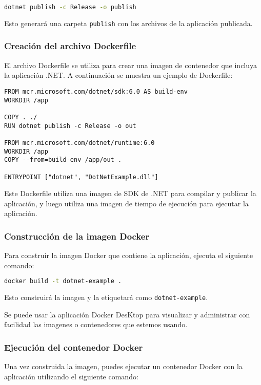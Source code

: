 \documentclass{article}
\begin{document}
\begin{lstlisting}[language=bash]
dotnet publish -c Release -o publish
\end{lstlisting}

Esto generará una carpeta \texttt{publish} con los archivos de la aplicación publicada.

\subsubsection*{Creación del archivo Dockerfile}
El archivo Dockerfile se utiliza para crear una imagen de contenedor que incluya la aplicación .NET. A continuación se muestra un ejemplo de Dockerfile:

\begin{lstlisting}
FROM mcr.microsoft.com/dotnet/sdk:6.0 AS build-env
WORKDIR /app

COPY . ./
RUN dotnet publish -c Release -o out

FROM mcr.microsoft.com/dotnet/runtime:6.0
WORKDIR /app
COPY --from=build-env /app/out .

ENTRYPOINT ["dotnet", "DotNetExample.dll"]
\end{lstlisting}

Este Dockerfile utiliza una imagen de SDK de .NET para compilar y publicar la aplicación, y luego utiliza una imagen de tiempo de ejecución para ejecutar la aplicación.

\subsubsection*{Construcción de la imagen Docker}
Para construir la imagen Docker que contiene la aplicación, ejecuta el siguiente comando:

\begin{lstlisting}[language=bash]
docker build -t dotnet-example .
\end{lstlisting}

Esto construirá la imagen y la etiquetará como \texttt{dotnet-example}.

Se puede usar la aplicación Docker DesKtop para visualizar y administrar con facilidad las imagenes o contenedores que estemos usando.

\subsubsection*{Ejecución del contenedor Docker}
Una vez construida la imagen, puedes ejecutar un contenedor Docker con la aplicación utilizando el siguiente comando:
\end{document}
